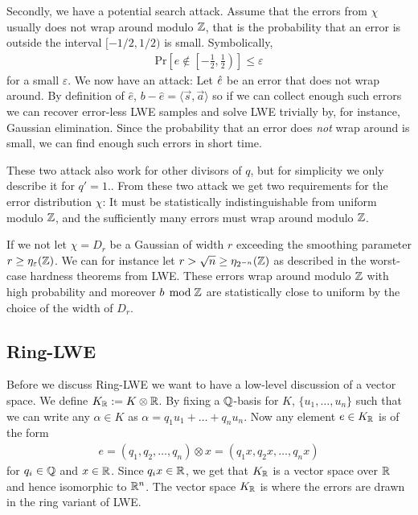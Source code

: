     Secondly, we have a potential search attack. Assume that the errors from \(\chi\) usually does not wrap around modulo \(\mathbb{Z}\), that is the probability that an error is outside the interval \([-1/2, 1/2)\) is small. Symbolically,
    \begin{align*}
        \text{Pr}\left[e\not\in\left[-\frac{1}{2}, \frac{1}{2}\right)\right] \leq \varepsilon
    \end{align*}
    for a small \(\varepsilon\). We now have an attack: Let \(\Hat{e}\) be an error that does not wrap around. By definition of \(\hat{e}\), \(b - \hat{e} = \langle \vec{s}, \vec{a}\rangle\) so if we can collect enough such errors we can recover error-less LWE samples and solve LWE trivially by, for instance, Gaussian elimination. Since the probability that an error does \emph{not} wrap around is small, we can find enough such errors in short time.\par
    
    These two attack also work for other divisors of \(q\), but for simplicity we only describe it for \(q' = 1\).. From these two attack we get two requirements for the error distribution \(\chi\): It must be statistically indistinguishable from uniform modulo \(\mathbb{Z}\), and the sufficiently many errors must wrap around modulo \(\mathbb{Z}\).\par
    
    If we not let \(\chi = D_r\) be a Gaussian of width \(r\) exceeding the smoothing parameter \(r \geq \eta_\varepsilon(\mathbb{Z})\). We can for instance let \(r > \sqrt{n} \geq \eta_{2^{-n}}(\mathbb{Z})\) as described in the worst-case hardness theorems from LWE. These errors wrap around modulo \(\mathbb{Z}\) with high probability  and moreover \(b\mathop{}\!\mathrm{\; mod \;}\mathbb{Z}\) are statistically close to uniform by the choice of the width of \(D_r\). 
    
\subsection{Ring-LWE}
    Before we discuss Ring-LWE we want to have a low-level discussion of a vector space. We define \(K_{\mathbb{R}} := K\otimes\mathbb{R}\). By fixing a \(\mathbb{Q}\)-basis for \(K\), \(\{u_1, \dots , u_n\}\) such that we can write any \(\alpha\in K\) as \(\alpha = q_1u_1 + \dots + q_n u_n\). Now any element \(e\in K_{\mathbb{R}}\) is of the form
    \begin{align*}
        e = (q_1, q_2, \dots , q_n)\otimes x = (q_1x,q_2x,\dots ,q_nx)
    \end{align*}
    for \(q_i\in\mathbb{Q}\) and \(x\in\mathbb{R}\). Since \(q_i x\in\mathbb{R}\), we get that \(K_{\mathbb{R}}\) is a vector space over \(\mathbb{R}\) and hence isomorphic to \(\mathbb{R}^n\). The vector space \(K_{\mathbb{R}}\) is where the errors are drawn in the ring variant of LWE.\par
    

